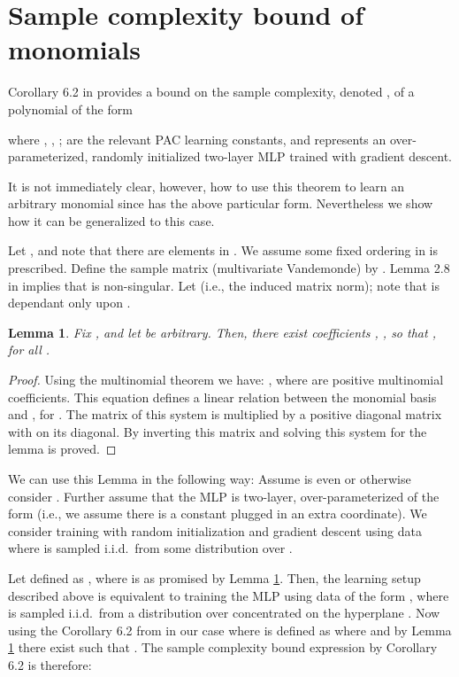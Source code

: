 \documentclass{article} \usepackage{iclr2021_conference,times}
\newcommand{\ie}{{i.e.}}
\newtheorem{lemma}{Lemma}
\begin{document}
\section{Sample complexity bound of monomials} \label{app:monomial_sample_complexity}
Corollary 6.2 in \citep{arora2019fine} provides a bound on the sample complexity, denoted , of a polynomial   of the form

where , , ;  are the relevant PAC learning constants, and  represents an over-parameterized, randomly initialized two-layer MLP trained with gradient descent. 



It is not immediately clear, however, how to use this theorem to learn an arbitrary monomial  since  has the above particular form. Nevertheless we show how it can be generalized to this case.

Let , and note that there are  elements in . We assume some fixed ordering in  is prescribed. Define the sample matrix (multivariate Vandemonde)  by . Lemma 2.8 in \citep{wendland2004scattered} implies that  is non-singular. Let  (\ie, the induced  matrix norm); note that  is dependant only upon . 
\begin{lemma}\label{lem:poly}
Fix , and let  be arbitrary. Then, there exist coefficients , , so that , for all .
\end{lemma}

\begin{proof}
Using the multinomial theorem we have: , where  are positive multinomial coefficients. This equation defines a linear relation between the monomial basis  and , for . The matrix of this system is  multiplied by a positive diagonal matrix with  on its diagonal. By inverting this matrix and solving this system for  the lemma is proved.  
\end{proof}
We can use this Lemma in the following way: Assume  is even or otherwise consider . Further assume that the MLP  is two-layer,  over-parameterized of the form  (\ie, we assume there is a constant  plugged in an extra  coordinate).
We consider training  with random initialization and gradient descent using data  where  is sampled i.i.d.~from some distribution  over . 

Let  defined as , where  is as promised by Lemma \ref{lem:poly}. Then, the learning setup described above is equivalent to training the MLP  using data of the form , where  is sampled i.i.d.~from a distribution  over  concentrated on the hyperplane . Now using the Corollary 6.2 from \citep{arora2019fine} in our case where  is defined as  where  and by Lemma \ref{lem:poly} there exist  such that .
The sample complexity bound expression by Corollary 6.2 is therefore:
\end{document}

